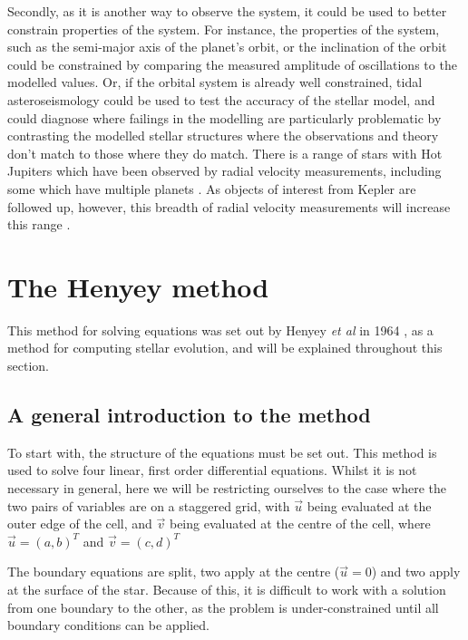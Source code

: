 \documentclass[11pt]{amsart}
\begin{document}
Secondly, as it is another way to observe the system, it could be used to better constrain properties of the system.  For instance, the properties of the system, such as the semi-major axis of the planet's orbit, or the inclination of the orbit could be constrained by comparing the measured amplitude of oscillations to the modelled values.  Or, if the orbital system is already well constrained, tidal asteroseismology could be used to test the accuracy of the stellar model, and could diagnose where failings in the modelling are particularly problematic by contrasting the modelled stellar structures where the observations and theory don't match to those where they do match.  There is a range of stars with Hot Jupiters which have been observed by radial velocity measurements, including some which have multiple planets \cite{NASAExoplanet}.  As objects of interest from Kepler are followed up, however, this  breadth of radial velocity measurements will increase this range \cite{Crouzet2017}.











\section{The Henyey method}

This method for solving equations was set out by Henyey \textit{et al} in 1964 \cite{Henyey1964}, as a method for computing stellar evolution, and will be explained throughout this section. 

\subsection{A general introduction to the method}

To start with, the structure of the equations must be set out.  This method is used to solve four linear, first order differential equations.  Whilst it is not necessary in general, here we will be restricting ourselves to the case where the two pairs of variables are on a staggered grid, with $\vec{u}$ being evaluated at the outer edge of the cell, and $\vec{v}$ being evaluated at the centre of the cell, where $\vec{u} = \left( a, b \right)^{T}$ and $\vec{v} = \left( c, d \right)^{T}$

The boundary equations are split, two apply at the centre ($\vec{u} = 0$) and two apply at the surface of the star.  Because of this, it is difficult to work with a solution from one boundary to the other, as the problem is under-constrained until all boundary conditions can be applied.
\end{document}

